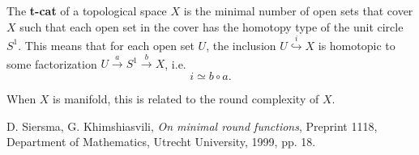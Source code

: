 \documentclass[12pt]{article}
\begin{document}
The {\bf t-cat} of a topological space $X$ is the minimal number of open sets that cover $X$ such that each open set in the cover has the homotopy type of the unit circle $S^1$.  This means that for each open set $U$, the inclusion $U\stackrel{i}\hookrightarrow X$ is homotopic to some factorization $U\stackrel{a}\to S^1\stackrel{b}\to X$, i.e.
$$i\simeq b\circ a.$$
 
When $X$ is manifold, this is related to the round complexity of $X$.

\begin{thebibliography}{9}
 D. Siersma, G. Khimshiasvili, {\it On minimal round functions}, Preprint 1118, Department of Mathematics, Utrecht University, 1999, pp. 18.
\end{thebibliography}

\end{document}
